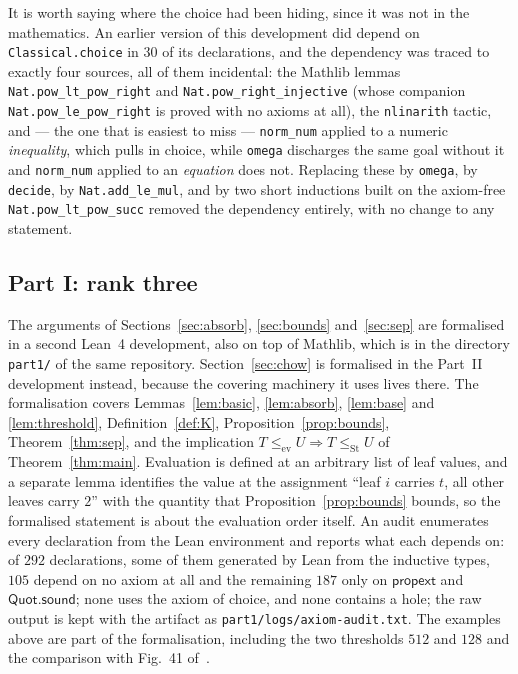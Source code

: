 \documentclass[11pt,a4paper]{article}
\theoremstyle{plain}
\theoremstyle{definition}
\newcommand{\ev}{\mathrm{ev}}
\newcommand{\St}{\mathrm{St}}
\begin{document}
It is worth saying where the choice had been hiding, since it was not in the
mathematics. An earlier version of this development did depend on
\verb|Classical.choice| in $30$ of its declarations, and the dependency was traced
to exactly four sources, all of them incidental: the Mathlib lemmas
\verb|Nat.pow_lt_pow_right| and \verb|Nat.pow_right_injective| (whose companion
\verb|Nat.pow_le_pow_right| is proved with no axioms at all), the \verb|nlinarith|
tactic, and --- the one that is easiest to miss --- \verb|norm_num| applied to a
numeric \emph{inequality}, which pulls in choice, while \verb|omega| discharges the
same goal without it and \verb|norm_num| applied to an \emph{equation} does not.
Replacing these by \verb|omega|, by \verb|decide|, by \verb|Nat.add_le_mul|, and by
two short inductions built on the axiom-free \verb|Nat.pow_lt_pow_succ| removed the
dependency entirely, with no change to any statement.

\subsection{Part I: rank three}

The arguments of Sections~\ref{sec:absorb}, \ref{sec:bounds} and~\ref{sec:sep} are
formalised in a second Lean~4 development, also on top of Mathlib, which is in the
directory \verb|part1/| of the same repository.
Section~\ref{sec:chow} is formalised in the Part~II development instead, because the
covering machinery it uses lives there. The formalisation covers Lemmas~\ref{lem:basic},
\ref{lem:absorb}, \ref{lem:base} and \ref{lem:threshold}, Definition~\ref{def:K},
Proposition~\ref{prop:bounds}, Theorem~\ref{thm:sep}, and the implication
$T\le_{\ev}U\Rightarrow T\le_{\St}U$ of Theorem~\ref{thm:main}. Evaluation is defined at
an arbitrary list of leaf values, and a separate lemma identifies the value at the
assignment ``leaf $i$ carries $t$, all other leaves carry $2$'' with the quantity that
Proposition~\ref{prop:bounds} bounds, so the formalised statement is about the evaluation
order itself. An audit enumerates every declaration from the Lean environment and
reports what each depends on: of $292$ declarations, some of them generated by Lean from
the inductive types, $105$ depend on no axiom at all and the remaining $187$ only on
$\mathsf{propext}$ and $\mathsf{Quot.sound}$; none uses the axiom of choice, and none
contains a hole; the raw output is kept with the artifact as
\verb|part1/logs/axiom-audit.txt|. The examples above are part of the
formalisation, including the two thresholds $512$ and $128$ and the comparison with
Fig.~41 of~\cite{Knuth}.
\end{document}
